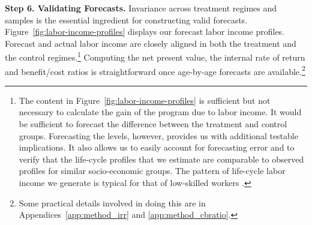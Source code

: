 \textbf{Step 6. Validating Forecasts.} Invariance across treatment regimes and samples is the essential ingredient for constructing valid forecasts. Figure~\ref{fig:labor-income-profiles} displays our forecast labor income profiles. Forecast and actual labor income are closely aligned in both the treatment and the control regimes.\footnote{The content in Figure~\ref{fig:labor-income-profiles} is sufficient but not necessary to calculate the gain of the program due to labor income. It would be sufficient to forecast the difference between the treatment and control groups. Forecasting the levels, however, provides us with additional testable implications. It also allows us to easily account for forecasting error and to verify that the life-cycle profiles that we estimate are comparable to observed profiles for similar socio-economic groups. The pattern of life-cycle labor income we generate is typical for that of low-skilled workers \citep{Blundell-etal_2015_J-Pub-E,Gladden_Taber_2000_WageProgression,Sanders-Taber_2012_AR,Lagakos_Moll_etal_2016_LifeCycle_NBER}.} Computing the net present value, the internal rate of return and benefit/cost ratios is straightforward once age-by-age forecasts are available.\footnote{Some practical details involved in doing this are in Appendices~\ref{app:method_irr} and \ref{app:method_cbratio}.}

